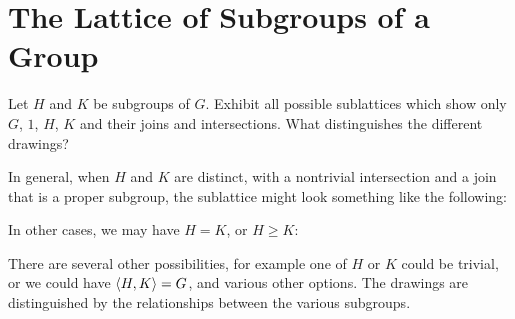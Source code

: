 \section{The Lattice of Subgroups of a Group}

 Let $H$ and $K$ be subgroups of $G$. Exhibit all possible
sublattices which show only $G$, $1$, $H$, $K$ and their joins and
intersections. What distinguishes the different drawings?
\begin{solution}
  In general, when $H$ and $K$ are distinct, with a nontrivial
  intersection and a join that is a proper subgroup, the sublattice
  might look something like the following:
  \begin{center}
  \end{center}
  In other cases, we may have $H = K$, or $H\geq K$:
  \begin{center}
  \end{center}
  There are several other possibilities, for example one of $H$ or $K$
  could be trivial, or we could have $\langle{H,K}\rangle = G$, and various
  other options. The drawings are distinguished by the relationships
  between the various subgroups.
\end{solution}

